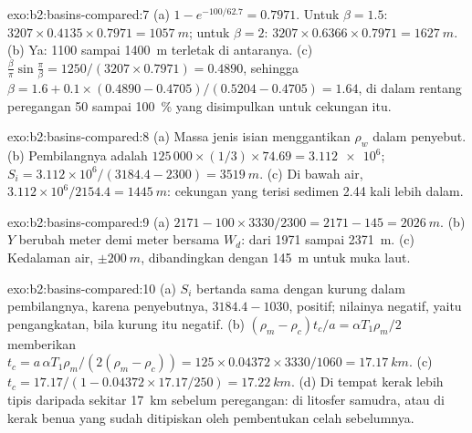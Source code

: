 \begin{solution}{exo:b2:basins-compared:7}
(a) $1 - e^{-100/62.7} = 0.7971$. Untuk $\beta = 1.5$: $3207\times0.4135\times0.7971 =
\qty{1057}{m}$; untuk $\beta = 2$: $3207\times0.6366\times0.7971 = \qty{1627}{m}$. (b) Ya: 1100 sampai
\qty{1400}{m} terletak di antaranya. (c) $\frac{\beta}{\pi}\sin\frac{\pi}{\beta} = 1250/(3207\times0.7971)
= 0.4890$, sehingga $\beta = 1.6 + 0.1\times(0.4890 - 0.4705)/(0.5204 - 0.4705) = 1.64$, di dalam rentang
peregangan 50 sampai \qty{100}{\percent} yang disimpulkan untuk cekungan itu.
\end{solution}

\begin{solution}{exo:b2:basins-compared:8}
(a) Massa jenis isian menggantikan $\rho_w$ dalam penyebut. (b) Pembilangnya adalah
$125\,000\times(1/3)\times74.69 = \num{3.112e6}$; $S_i = 3.112\times10^{6}/(3184.4 - 2300) =
\qty{3519}{m}$. (c) Di bawah air, $3.112\times10^{6}/2154.4 = \qty{1445}{m}$: cekungan yang terisi sedimen
2.44 kali lebih dalam.
\end{solution}

\begin{solution}{exo:b2:basins-compared:9}
(a) $2171 - 100\times3330/2300 = 2171 - 145 = \qty{2026}{m}$. (b) $Y$ berubah meter demi meter
bersama $W_d$: dari 1971 sampai \qty{2371}{m}. (c) Kedalaman air, $\pm\qty{200}{m}$, dibandingkan dengan
\qty{145}{m} untuk muka laut.
\end{solution}

\begin{solution}{exo:b2:basins-compared:10}
(a) $S_i$ bertanda sama dengan kurung dalam pembilangnya, karena penyebutnya, $3184.4 - 1030$,
positif; nilainya negatif, yaitu pengangkatan, bila kurung itu negatif. (b) $(\rho_m - \rho_c)t_c/a =
\alpha T_1\rho_m/2$ memberikan $t_c = a\,\alpha T_1\rho_m/(2(\rho_m - \rho_c)) = 125\times0.04372\times
3330/1060 = \qty{17.17}{km}$. (c) $t_c = 17.17/(1 - 0.04372\times17.17/250) = \qty{17.22}{km}$.
(d) Di tempat kerak lebih tipis daripada sekitar \qty{17}{km} sebelum peregangan: di litosfer samudra,
atau di kerak benua yang sudah ditipiskan oleh pembentukan celah sebelumnya.
\end{solution}

